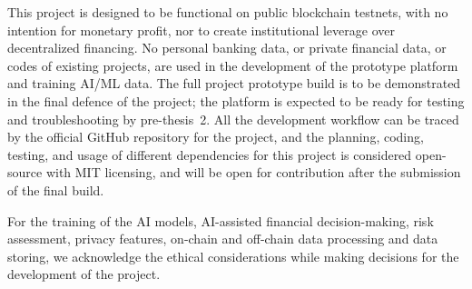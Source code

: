 This project is designed to be functional on public blockchain testnets, with no intention for monetary profit, nor to create institutional leverage over decentralized financing. No personal banking data, or private financial data, or codes of existing projects, are used in the development of the prototype platform and training AI/ML data. The full project prototype build is to be demonstrated in the final defence of the project; the platform is expected to be ready for testing and troubleshooting by pre-thesis~2. All the development workflow can be traced by the official GitHub repository for the project, and the planning, coding, testing, and usage of different dependencies for this project is considered open-source with MIT licensing, and will be open for contribution after the submission of the final build.

For the training of the AI models, AI-assisted financial decision-making, risk assessment, privacy features, on-chain and off-chain data processing and data storing, we acknowledge the ethical considerations while making decisions for the development of the project.
